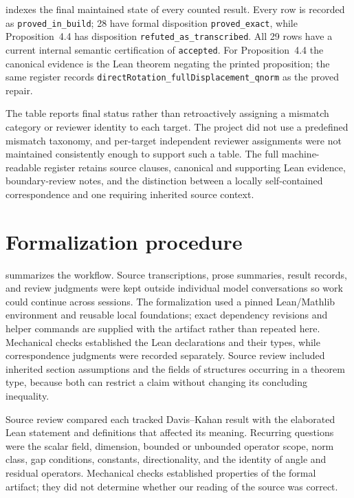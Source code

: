  indexes the final maintained state of every counted
result.  Every row is recorded as \texttt{proved\_in\_build}; 28 have formal
disposition \texttt{proved\_exact}, while Proposition~4.4 has disposition
\texttt{refuted\_as\_transcribed}.  All 29 rows have a current internal semantic
certification of \texttt{accepted}.  For Proposition~4.4 the canonical evidence
is the Lean theorem negating the printed proposition; the same register records
\texttt{directRotation\_fullDisplacement\_qnorm} as the proved repair.

The table reports final status rather than retroactively assigning a mismatch
category or reviewer identity to each target.  The project did not use a
predefined mismatch taxonomy, and per-target independent reviewer assignments
were not maintained consistently enough to support such a table.  The full
machine-readable register retains source clauses, canonical and supporting
Lean evidence, boundary-review notes, and the distinction between a locally
self-contained correspondence and one requiring inherited source context.

{\scriptsize
\setlength{\tabcolsep}{2pt}

}

\section{Formalization procedure}
\label{app:system}

 summarizes the workflow.  Source transcriptions, prose
summaries, result records, and review judgments were kept outside individual
model conversations so work could continue across sessions.  The formalization
used a pinned Lean/Mathlib environment and reusable local foundations; exact
dependency revisions and helper commands are supplied with the artifact rather
than repeated here.  Mechanical checks established the Lean declarations and
their types, while correspondence judgments were recorded separately.  Source
review included inherited section assumptions and the fields of structures
occurring in a theorem type, because both can restrict a claim without changing
its concluding inequality.

Source review compared each tracked Davis--Kahan result with the elaborated Lean
statement and definitions that affected its meaning.  Recurring questions were
the scalar field, dimension, bounded or unbounded operator scope, norm class,
gap conditions, constants, directionality, and the identity of angle and
residual operators.  Mechanical checks established properties of the formal
artifact; they did not determine whether our reading of the source was correct.

